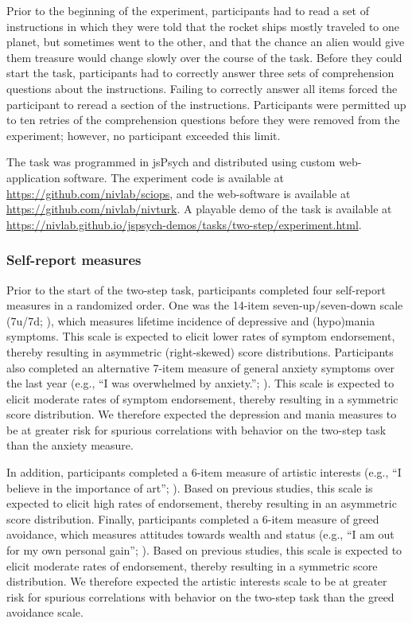 \documentclass[a4paper,notitlepage,12pt]{article}
\begin{document}
Prior to the beginning of the experiment, participants had to read a set of instructions in which they were told that the rocket ships mostly traveled to one planet, but sometimes went to the other, and that the chance an alien would give them treasure would change slowly over the course of the task. Before they could start the task, participants had to correctly answer three sets of comprehension questions about the instructions. Failing to correctly answer all items forced the participant to reread a section of the instructions. Participants were permitted up to ten retries of the comprehension questions before they were removed from the experiment; however, no participant exceeded this limit. 

The task was programmed in jsPsych \cite{deleeuw_2015_jspsych-2} and distributed using custom web-application software. The experiment code is available at \url{https://github.com/nivlab/sciops}, and the web-software is available at \url{https://github.com/nivlab/nivturk}. A playable demo of the task is available at \url{https://nivlab.github.io/jspsych-demos/tasks/two-step/experiment.html}.

\subsubsection*{Self-report measures}

Prior to the start of the two-step task, participants completed four self-report measures in a randomized order. One was the 14-item seven-up/seven-down scale (7u/7d; \cite{youngstrom_2013_susd-2}), which measures lifetime incidence of depressive and (hypo)mania symptoms. This scale is expected to elicit lower rates of symptom endorsement, thereby resulting in asymmetric (right-skewed) score distributions. Participants also completed an alternative 7-item measure of general anxiety symptoms over the last year (e.g., ``I was overwhelmed by anxiety.''; \cite{watson2022development}). This scale is expected to elicit moderate rates of symptom endorsement, thereby resulting in a symmetric score distribution. We therefore expected the depression and mania measures to be at greater risk for spurious correlations with behavior on the two-step task than the anxiety measure. 

In addition, participants completed a 6-item measure of artistic interests (e.g., ``I believe in the importance of art''; \cite{ashton2007empirical}). Based on previous studies, this scale is expected to elicit high rates of endorsement, thereby resulting in an asymmetric score distribution. Finally, participants completed a 6-item measure of greed avoidance, which measures attitudes towards wealth and status (e.g., ``I am out for my own personal gain''; \cite{ashton2007empirical}). Based on previous studies, this scale is expected to elicit moderate rates of endorsement, thereby resulting in a symmetric score distribution. We therefore expected the artistic interests scale to be at greater risk for spurious correlations with behavior on the two-step task than the greed avoidance scale. 
\end{document}
